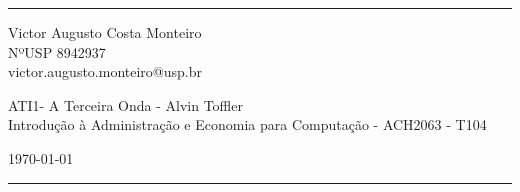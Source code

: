 \documentclass[a4paper]{article}
\begin{document}

\fancyhead[C]{}
\hrule \medskip %
\begin{minipage}{0.295\textwidth} 
    \raggedright
    \footnotesize
    Victor Augusto Costa Monteiro \hfill\\   
    NºUSP 8942937 \hfill\\
    victor.augusto.monteiro@usp.br
\end{minipage}
\begin{minipage}{0.4\textwidth} 
    \centering 
    \large 
    ATI1- A Terceira Onda - Alvin Toffler\\ 
    \normalsize 
    Introdução à Administração e Economia para Computação - ACH2063 - T104\\ 
\end{minipage}
\begin{minipage}{0.295\textwidth} 
    \raggedleft
    \today\hfill\\
\end{minipage}
\medskip\hrule 




%
%
%
%
%
%
%
\end{document}
